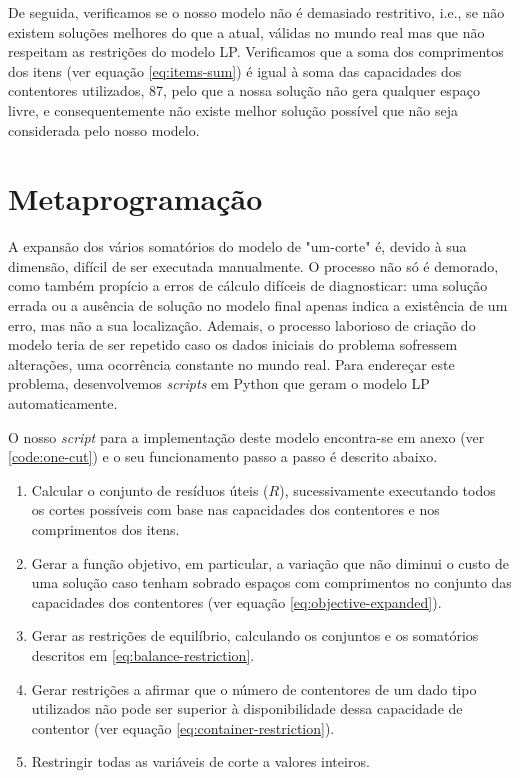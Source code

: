 \documentclass[12pt, a4paper, titlepage]{article}
\begin{document}
De seguida, verificamos se o nosso modelo não é demasiado restritivo, i.e., se não existem soluções
melhores do que a atual, válidas no mundo real mas que não respeitam as restrições do modelo LP.
Verificamos que a soma dos comprimentos dos itens (ver equação \ref{eq:items-sum}) é igual à soma
das capacidades dos contentores utilizados, 87, pelo que a nossa solução não gera qualquer espaço
livre, e consequentemente não existe melhor solução possível que não seja considerada pelo nosso
modelo.

\section{Metaprogramação}

A expansão dos vários somatórios do modelo de "um-corte"{} é, devido à sua dimensão, difícil de ser
executada manualmente. O processo não só é demorado, como também propício a erros de cálculo
difíceis de diagnosticar: uma solução errada ou a ausência de solução no modelo final apenas indica
a existência de um erro, mas não a sua localização. Ademais, o processo laborioso de criação do
modelo teria de ser repetido caso os dados iniciais do problema sofressem alterações, uma ocorrência
constante no mundo real. Para endereçar este problema, desenvolvemos \emph{scripts} em Python que
geram o modelo LP automaticamente.

O nosso \emph{script} para a implementação deste modelo encontra-se em anexo (ver
\ref{code:one-cut}) e o seu funcionamento passo a passo é descrito abaixo.

\begin{enumerate}
    \item Calcular o conjunto de resíduos úteis ($R$), sucessivamente executando todos os cortes
        possíveis com base nas capacidades dos contentores e nos comprimentos dos itens.

    \item Gerar a função objetivo, em particular, a variação que não diminui o custo de uma solução
        caso tenham sobrado espaços com comprimentos no conjunto das capacidades dos contentores
        (ver equação \ref{eq:objective-expanded}).

    \item Gerar as restrições de equilíbrio, calculando os conjuntos e os somatórios descritos em
        \eqref{eq:balance-restriction}.

    \item Gerar restrições a afirmar que o número de contentores de um dado tipo utilizados não pode
        ser superior à disponibilidade dessa capacidade de contentor (ver equação
        \ref{eq:container-restriction}).

    \item Restringir todas as variáveis de corte a valores inteiros.
\end{enumerate}
\end{document}

